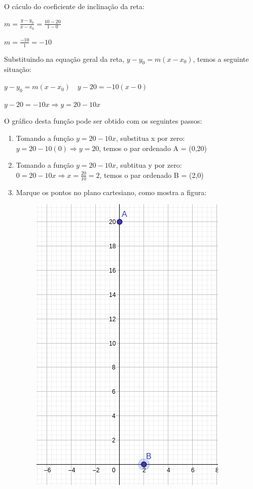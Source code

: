 \begin{multicols*}{2}
            O cáculo do coeficiente de inclinação da reta:
            
            $m = \frac{y-y_0}{x - x_0} = \frac{ 10 - 20}{ 1 - 0}$
            
            $m = \frac{-10}{1} = -10$
            
            Substituindo na equação geral da reta, $y - y_0 = m(x-x_0)$, temos a seguinte situação:
            
            $y - y_0 = m(x-x_0) \quad y - 20 = -10(x-0)$
            
            $y - 20 = -10x  \Rightarrow y = 20 -10x$
            
            O gráfico desta função pode ser obtido com os seguintes passos:
            \begin{enumerate}
            \item Tomando a função $ y = 20 -10x$, substitua x por zero: $y = 20 - 10(0) \Rightarrow
            y = 20$, temos o par ordenado A = (0,20)
            \item Tomando a função $ y = 20 -10x$, subtitua y por zero: $0 = 20 - 10x \Rightarrow 
            x = \frac{20}{10} = 2$, temos o par ordenado B = (2,0)
            \item Marque os pontos no plano cartesiano, como mostra a figura:
            \begin{figure}[H]
                \includegraphics[scale=0.3]{assets/rafael/img12.png}

\end{figure}
\end{enumerate}
\end{multicols*}
